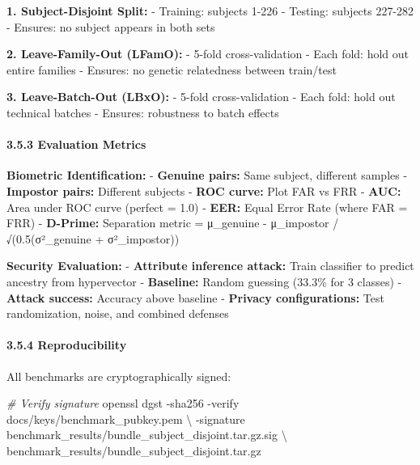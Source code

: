 \documentclass[
  11pt,
]{article}
\newenvironment{Shaded}{}{}
\newcommand{\AttributeTok}[1]{\textcolor[rgb]{0.49,0.56,0.16}{#1}}
\newcommand{\CommentTok}[1]{\textcolor[rgb]{0.38,0.63,0.69}{\textit{#1}}}
\newcommand{\DataTypeTok}[1]{\textcolor[rgb]{0.56,0.13,0.00}{#1}}
\newcommand{\ExtensionTok}[1]{#1}
\newcommand{\NormalTok}[1]{#1}
\begin{document}
\textbf{1. Subject-Disjoint Split:} - Training: subjects 1-226 -
Testing: subjects 227-282 - Ensures: no subject appears in both sets

\textbf{2. Leave-Family-Out (LFamO):} - 5-fold cross-validation - Each
fold: hold out entire families - Ensures: no genetic relatedness between
train/test

\textbf{3. Leave-Batch-Out (LBxO):} - 5-fold cross-validation - Each
fold: hold out technical batches - Ensures: robustness to batch effects

\paragraph{3.5.3 Evaluation Metrics}\label{evaluation-metrics}

\textbf{Biometric Identification:} - \textbf{Genuine pairs:} Same
subject, different samples - \textbf{Impostor pairs:} Different subjects
- \textbf{ROC curve:} Plot FAR vs FRR - \textbf{AUC:} Area under ROC
curve (perfect = 1.0) - \textbf{EER:} Equal Error Rate (where FAR = FRR)
- \textbf{D-Prime:} Separation metric = \textbar μ\_genuine -
μ\_impostor\textbar{} / √(0.5(σ²\_genuine + σ²\_impostor))

\textbf{Security Evaluation:} - \textbf{Attribute inference attack:}
Train classifier to predict ancestry from hypervector -
\textbf{Baseline:} Random guessing (33.3\% for 3 classes) -
\textbf{Attack success:} Accuracy above baseline - \textbf{Privacy
configurations:} Test randomization, noise, and combined defenses

\paragraph{3.5.4 Reproducibility}\label{reproducibility}

All benchmarks are cryptographically signed:

\begin{Shaded}
\begin{Highlighting}[]
\CommentTok{\# Verify signature}
\ExtensionTok{openssl}\NormalTok{ dgst }\AttributeTok{{-}sha256} \AttributeTok{{-}verify}\NormalTok{ docs/keys/benchmark\_pubkey.pem }\DataTypeTok{\textbackslash{}}
  \AttributeTok{{-}signature}\NormalTok{ benchmark\_results/bundle\_subject\_disjoint.tar.gz.sig }\DataTypeTok{\textbackslash{}}
\NormalTok{  benchmark\_results/bundle\_subject\_disjoint.tar.gz}
\end{Highlighting}
\end{Shaded}
\end{document}
